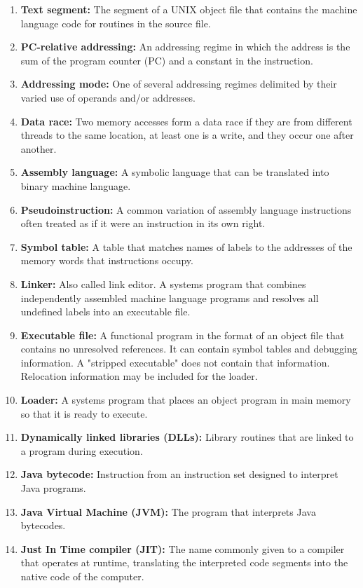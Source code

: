 \documentclass{article}
\begin{document}
\begin{enumerate}[label=\arabic*.]
    \item \textbf{Text segment:} The segment of a UNIX object file that contains the machine language code for routines in the source file.
    \item \textbf{PC-relative addressing:} An addressing regime in which the address is the sum of the program counter (PC) and a constant in the instruction.
    \item \textbf{Addressing mode:} One of several addressing regimes delimited by their varied use of operands and/or addresses.
    \item \textbf{Data race:} Two memory accesses form a data race if they are from different threads to the same location, at least one is a write, and they occur one after another.
    \item \textbf{Assembly language:} A symbolic language that can be translated into binary machine language.
    \item \textbf{Pseudoinstruction:} A common variation of assembly language instructions often treated as if it were an instruction in its own right.
    \item \textbf{Symbol table:} A table that matches names of labels to the addresses of the memory words that instructions occupy.
    \item \textbf{Linker:} Also called link editor. A systems program that combines independently assembled machine language programs and resolves all undefined labels into an executable file.
    \item \textbf{Executable file:} A functional program in the format of an object file that contains no unresolved references. It can contain symbol tables and debugging information. A "stripped executable" does not contain that information. Relocation information may be included for the loader.
    \item \textbf{Loader:} A systems program that places an object program in main memory so that it is ready to execute.
    \item \textbf{Dynamically linked libraries (DLLs):} Library routines that are linked to a program during execution.
    \item \textbf{Java bytecode:} Instruction from an instruction set designed to interpret Java programs.
    \item \textbf{Java Virtual Machine (JVM):} The program that interprets Java bytecodes.
    \item \textbf{Just In Time compiler (JIT):} The name commonly given to a compiler that operates at runtime, translating the interpreted code segments into the native code of the computer.
\end{enumerate}
\end{document}
